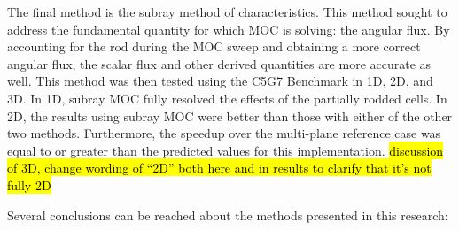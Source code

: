 The final method is the subray method of characteristics.  This method sought to address the fundamental quantity for which MOC is solving: the angular flux.  By accounting for the rod during the MOC sweep and obtaining a more correct angular flux, the scalar flux and other derived quantities are more accurate as well.  This method was then tested using the C5G7 Benchmark in 1D, 2D, and 3D.  In 1D, subray MOC fully resolved the effects of the partially rodded cells.  In 2D, the results using subray MOC were better than those with either of the other two methods.  Furthermore, the speedup over the multi-plane reference case was equal to or greater than the predicted values for this implementation.  \hl{discussion of 3D, change wording of ``2D'' both here and in results to clarify that it's not fully 2D}

Several conclusions can be reached about the methods presented in this research:

